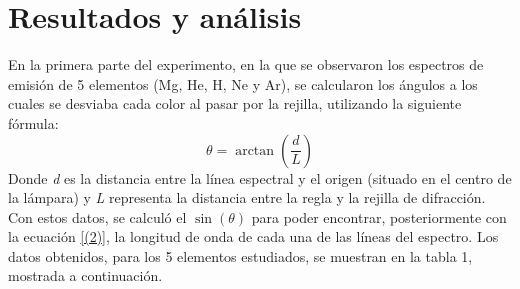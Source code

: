 \documentclass[%
 reprint,
 amsmath,amssymb,
 aps,
]{revtex4-1}
\begin{document}
\section{\label{sec:resultados} Resultados y análisis}
En la primera parte del experimento, en la que se observaron los espectros de emisión de 5 elementos (Mg, He, H, Ne y Ar), se calcularon los ángulos a los cuales se desviaba cada color al pasar por la rejilla, utilizando la siguiente fórmula: \\
\begin{equation}\label{(3)}
    \theta = \arctan(\frac{d}{L})
\end{equation}
Donde \textit{d} es la distancia entre la línea espectral y el origen (situado en el centro de la lámpara) y \textit{L} representa la distancia entre la regla y la rejilla de difracción. \\ 
 Con estos datos, se calculó el $\sin{(\theta)}$ para poder encontrar, posteriormente con la ecuación \eqref{(2)}, la longitud de onda de cada una de las líneas del espectro. Los datos obtenidos, para los 5 elementos estudiados, se muestran en la tabla 1, mostrada a continuación.
 
\end{document}
